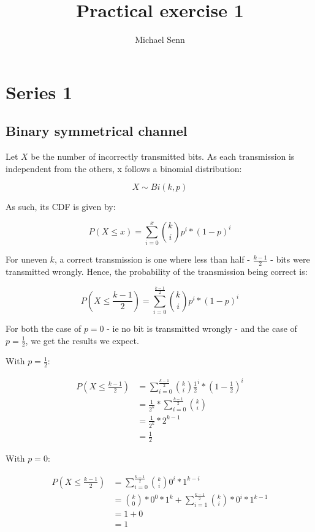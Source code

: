 \documentclass[a4paper]{scrreprt}
\title{Practical exercise 1}
\author{Michael Senn \maillink{michael.senn@students.unibe.ch}}
\date{\printdate}
\begin{document}
\maketitle

\chapter{Series 1}

\section{Binary symmetrical channel}

Let $X$ be the number of incorrectly transmitted bits. As each transmission is
independent from the others, x follows a binomial distribution:

\[
	X \sim Bi(k, p)
\]

As such, its CDF is given by:

\[
	P(X \leq x) = \sum_{i=0}^{x}{\binom{k}{i} p^i * (1-p)^i}
\]

For uneven $k$, a correct transmission is one where less than half -
$\frac{k-1}{2}$ - bits were transmitted wrongly. Hence, the probability of the
transmission being correct is:

\[
	P(X \leq \frac{k-1}{2}) = \sum_{i=0}^{\frac{k-1}{2}}{\binom{k}{i} p^i * (1-p)^i}
\]

For both the case of $p = 0$ - ie no bit is transmitted wrongly - and the case
of $p = \frac{1}{2}$, we get the results we expect.

With $p = \frac{1}{2}$:

\begin{align*}
	P(X \leq \frac{k-1}{2}) & = \sum_{i=0}^{\frac{k-1}{2}}{\binom{k}{i} \frac{1}{2}^i * (1-\frac{1}{2})^i} \\
				& = \frac{1}{2^k} * \sum_{i=0}^{\frac{k-1}{2}}{\binom{k}{i}} \\
				& = \frac{1}{2^k} * 2^{k-1} \\
				& = \frac{1}{2}
\end{align*}

With $p = 0$:

\begin{align*}
	P(X \leq \frac{k-1}{2}) & = \sum_{i=0}^{\frac{k-1}{2}}{\binom{k}{i} 0^i * 1^{k-i}} \\
			        & = \binom{k}{0} * 0^0 * 1^k + \sum_{i=1}^{\frac{k-1}{2}}{\binom{k}{i} * 0^i * 1^{k-1}} \\
		                & = 1 + 0 \\
	                        & = 1
\end{align*}
\end{document}
